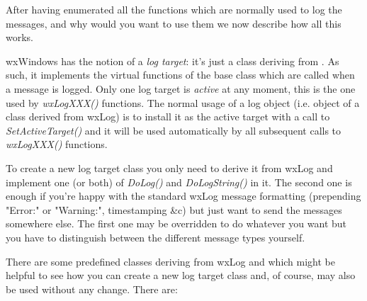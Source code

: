 After having enumerated all the functions which are normally used to log the
messages, and why would you want to use them we now describe how all this
works.

wxWindows has the notion of a {\it log target}: it's just a class deriving
from . As such, it implements the virtual functions of
the base class which are called when a message is logged. Only one log target
is {\it active} at any moment, this is the one used by {\it wxLogXXX()}
functions. The normal usage of a log object (i.e. object of a class derived
from wxLog) is to install it as the active target with a call to {\it
SetActiveTarget()} and it will be used automatically by all subsequent calls
to {\it wxLogXXX()} functions.

To create a new log target class you only need to derive it from wxLog and
implement one (or both) of {\it DoLog()} and {\it DoLogString()} in it. The
second one is enough if you're happy with the standard wxLog message
formatting (prepending "Error:" or "Warning:", timestamping \&c) but just want
to send the messages somewhere else. The first one may be overridden to do
whatever you want but you have to distinguish between the different message
types yourself.

There are some predefined classes deriving from wxLog and which might be
helpful to see how you can create a new log target class and, of course, may
also be used without any change. There are:

